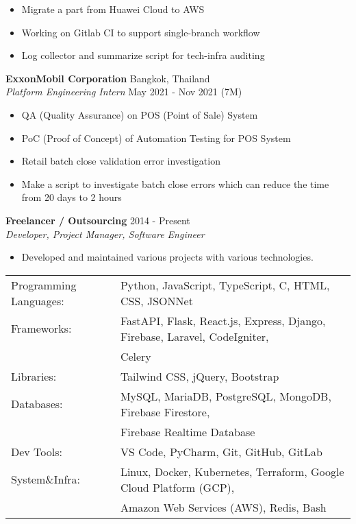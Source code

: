 \begin{itemize}
	\item Migrate a part from Huawei Cloud to AWS
	\item Working on Gitlab CI to support single-branch workflow
	\item Log collector and summarize script for tech-infra auditing
\end{itemize}
\vspace{-1mm}
\textbf{ExxonMobil Corporation} \hfill Bangkok, Thailand\\
\textit{Platform Engineering Intern} \hfill May 2021 - Nov 2021 (7M)\\
\vspace{-1mm}
\begin{itemize}
	\item QA (Quality Assurance) on POS (Point of Sale) System
	\item PoC (Proof of Concept) of Automation Testing for POS System
	\item Retail batch close validation error investigation
	\item Make a script to investigate batch close errors which can reduce the time from 20 days to 2 hours
\end{itemize}
\vspace{-1mm}
\textbf{Freelancer / Outsourcing} \hfill 2014 - Present\\
\textit{Developer, Project Manager, Software Engineer}\\
\vspace{-1mm}
\begin{itemize}
	\item Developed and maintained various projects with various technologies.
\end{itemize}
\vspace{-1mm}

\begin{tabular}{ l l }
	Programming Languages: & Python, JavaScript, TypeScript, C, HTML, CSS, JSONNet                         \\
	Frameworks:            & FastAPI, Flask, React.js, Express, Django, Firebase, Laravel, CodeIgniter,  \\ & Celery        \\
	Libraries:             & Tailwind CSS, jQuery, Bootstrap                                                          \\
	Databases:             & MySQL, MariaDB, PostgreSQL, MongoDB, Firebase Firestore, \\ & Firebase Realtime Database      \\
	Dev Tools:             & VS Code, PyCharm, Git, GitHub, GitLab                                                    \\
	System\&Infra:         & Linux, Docker, Kubernetes, Terraform, Google Cloud Platform (GCP), \\ & Amazon Web Services (AWS), Redis, Bash \\
\end{tabular}
\vspace{2mm}

